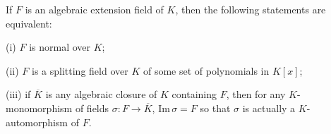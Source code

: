 If $F$ is an algebraic extension field of $K$, then the following statements are equivalent:

(i) $F$ is normal over $K$;

(ii) $F$ is a splitting field over $K$ of some set of polynomials in $K[x]$;

(iii) if $\overline{K}$ is any algebraic closure of $K$ containing $F$, then for any $K$-monomorphism of fields $\sigma : F \to \overline{K}$, $\mathrm{Im}\,\sigma = F$ so that $\sigma$ is actually a $K$-automorphism of $F$.
